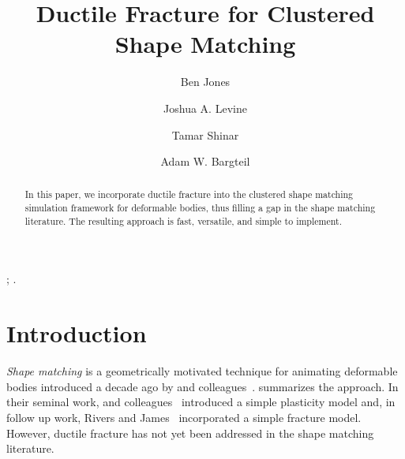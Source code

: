 \documentclass[review]{acmsiggraph}
\title{Ductile Fracture for Clustered Shape Matching}
\author[*]{Ben Jones}
\author[**]{Joshua A. Levine}
\author[***]{Tamar Shinar}
\author[*]{Adam W. Bargteil}
\affil[*]{University of Utah}
\affil[**]{Clemson University}
\affil[***]{University of California, Riverside}
\begin{document}


\maketitle

\begin{abstract}
In this paper, we incorporate ductile fracture into the clustered shape matching simulation framework
for deformable bodies, thus filling a gap in the shape matching literature.  The resulting approach is fast,
versatile, and simple to implement.
\end{abstract}

\begin{CRcatlist}
  ;
  .
\end{CRcatlist}

\keywordlist


\copyrightspace

\section{Introduction}\label{sec:Introduction}
{\em Shape matching} is a geometrically motivated technique for animating deformable bodies introduced
a decade ago by \Mueller and colleagues~.
 summarizes the approach.
In their seminal work, \Mueller and colleagues~ introduced a simple plasticity
model and, in follow up work, Rivers and James~
incorporated a simple fracture model.  However, ductile fracture has not yet been addressed in the
shape matching literature.
\end{document}
